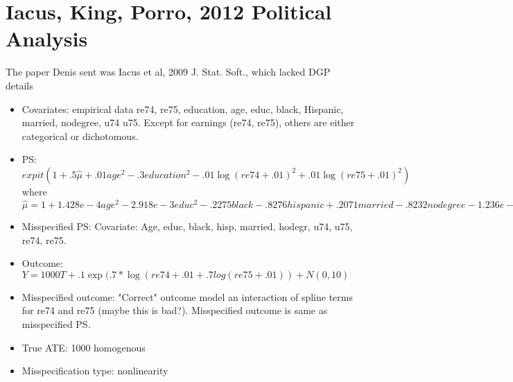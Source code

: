 \documentclass{article}
\begin{document}
\section{Iacus, King, Porro, 2012 Political Analysis \cite{Iacus2009}}
{\color{red} The paper Denis sent was Iacus et al, 2009 J. Stat. Soft., which lacked DGP details}
\begin{itemize}
\item Covariates: empirical data re74, re75, education, age, educ, black, Hispanic, married, nodegree, u74 u75.  Except for earnings (re74, re75), others are either categorical or dichotomous. 
\item PS: $expit(1+.5\hat \mu + .01age^2 -.3 education^2 - .01\log(re74+.01)^2 + .01\log(re75+.01)^2)$ where \\
$\hat\mu = 1+1.428e-4 age^2 -2.918e-3 educ^2 - .2275black - .8276 hispanic + .2071 married - .8232 nodegree -1.236e-9 re74^2 + 5.868e-10 re75^2 - .04328 u74 - .3804 u75$
\item Misspecified PS: Covariate: Age, educ, black, hisp, married, hodegr, u74, u75, re74, re75. 
\item Outcome: $Y = 1000T + .1\exp(.7*\log(re74+.01 + .7log(re75+.01)) + N(0, 10)$
\item Misspecified outcome: "Correct" outcome model an interaction of spline terms for re74 and re75 (maybe this is bad?). Misspecified outcome is same as misspecified PS.
\item True ATE: 1000 homogenous
\item Misspecification type: nonlinearity
\end{itemize}
\end{document}
